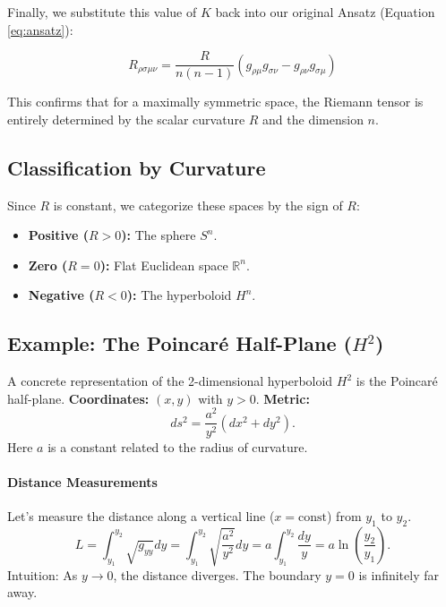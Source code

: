 \documentclass[11pt, a4paper]{report}
\begin{document}
Finally, we substitute this value of $K$ back into our original Ansatz (Equation \ref{eq:ansatz}):

\begin{equation}
    R_{\rho\sigma\mu\nu} = \frac{R}{n(n-1)} (g_{\rho\mu} g_{\sigma\nu} - g_{\rho\nu} g_{\sigma\mu})
\end{equation}

This confirms that for a maximally symmetric space, the Riemann tensor is entirely determined by the scalar curvature $R$ and the dimension $n$.
\subsection*{Classification by Curvature}
Since $R$ is constant, we categorize these spaces by the sign of $R$:
\begin{itemize}
    \item \textbf{Positive ($R > 0$):} The sphere $S^n$.
    \item \textbf{Zero ($R = 0$):} Flat Euclidean space $\mathbb{R}^n$.
    \item \textbf{Negative ($R < 0$):} The hyperboloid $H^n$.
\end{itemize}

\subsection*{Example: The Poincaré Half-Plane ($H^2$)}
A concrete representation of the 2-dimensional hyperboloid $H^2$ is the Poincaré half-plane.
\textbf{Coordinates:} $(x, y)$ with $y > 0$.
\textbf{Metric:}
\begin{equation}
ds^2 = \frac{a^2}{y^2} (dx^2 + dy^2).
\end{equation}
Here $a$ is a constant related to the radius of curvature.

\paragraph{Distance Measurements}
Let's measure the distance along a vertical line ($x = \text{const}$) from $y_1$ to $y_2$.
\begin{equation}
L = \int_{y_1}^{y_2} \sqrt{g_{yy}} dy = \int_{y_1}^{y_2} \sqrt{\frac{a^2}{y^2}} dy = a \int_{y_1}^{y_2} \frac{dy}{y} = a \ln \left( \frac{y_2}{y_1} \right).
\end{equation}
Intuition: As $y \to 0$, the distance diverges. The boundary $y=0$ is infinitely far away.
\end{document}
